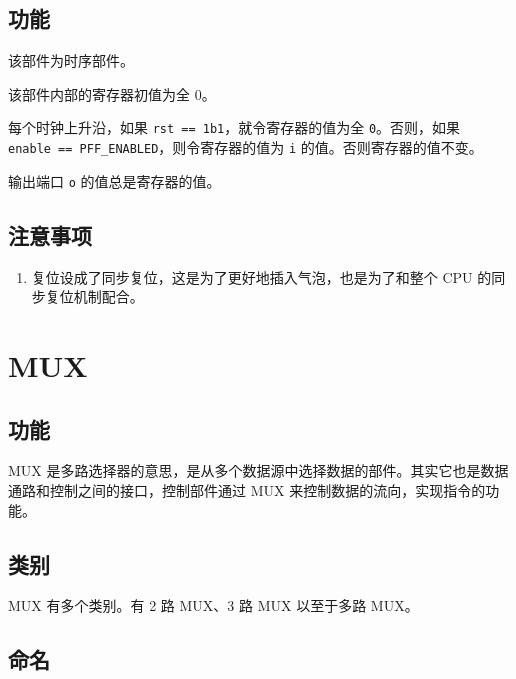 \documentclass[12pt,AutoFakeBold,AutoFakeSlant]{article}
\providecommand{\tightlist}{%
  \setlength{\itemsep}{0pt}\setlength{\parskip}{0pt}}
\begin{document}
\hypertarget{ux529fux80fd-13}{%
\subsection{功能}\label{ux529fux80fd-13}}

该部件为时序部件。

该部件内部的寄存器初值为全 0。

每个时钟上升沿，如果
\texttt{rst\ ==\ 1\textquotesingle{}b1}，就令寄存器的值为全
\texttt{0}。否则，如果
\texttt{enable\ ==\ PFF\_ENABLED}，则令寄存器的值为 \texttt{i}
的值。否则寄存器的值不变。

输出端口 \texttt{o} 的值总是寄存器的值。

\hypertarget{ux6ce8ux610fux4e8bux9879-9}{%
\subsection{注意事项}\label{ux6ce8ux610fux4e8bux9879-9}}

\begin{enumerate}
\def\labelenumi{\arabic{enumi}.}
\tightlist
\item
  复位设成了同步复位，这是为了更好地插入气泡，也是为了和整个 CPU 的同步复位机制配合。
\end{enumerate}

\hypertarget{mux}{%
\section{MUX}\label{mux}}

\hypertarget{ux529fux80fd-14}{%
\subsection{功能}\label{ux529fux80fd-14}}

MUX
是多路选择器的意思，是从多个数据源中选择数据的部件。其实它也是数据通路和控制之间的接口，控制部件通过
MUX 来控制数据的流向，实现指令的功能。

\hypertarget{ux7c7bux522b}{%
\subsection{类别}\label{ux7c7bux522b}}

MUX 有多个类别。有 2 路 MUX、3 路 MUX 以至于多路 MUX。

\hypertarget{ux547dux540d}{%
\subsection{命名}\label{ux547dux540d}}
\end{document}
